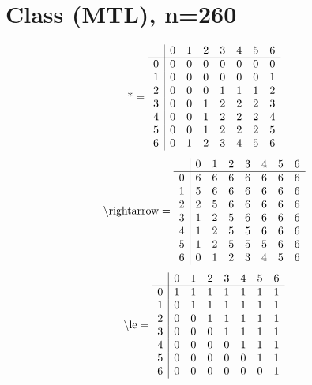 \documentclass[11pt]{article}
\begin{document}
\section{Class (MTL), n=260}
\[\text{*} = 
\begin{array}{r | r r r r r r r}
 & 0 & 1 & 2 & 3 & 4 & 5 & 6 \\ \hline
0 & 0 & 0 & 0 & 0 & 0 & 0 & 0 \\
1 & 0 & 0 & 0 & 0 & 0 & 0 & 1 \\
2 & 0 & 0 & 0 & 1 & 1 & 1 & 2 \\
3 & 0 & 0 & 1 & 2 & 2 & 2 & 3 \\
4 & 0 & 0 & 1 & 2 & 2 & 2 & 4 \\
5 & 0 & 0 & 1 & 2 & 2 & 2 & 5 \\
6 & 0 & 1 & 2 & 3 & 4 & 5 & 6 \\
\end{array}
\]
\[\text{\textbackslash rightarrow} = 
\begin{array}{r | r r r r r r r}
 & 0 & 1 & 2 & 3 & 4 & 5 & 6 \\ \hline
0 & 6 & 6 & 6 & 6 & 6 & 6 & 6 \\
1 & 5 & 6 & 6 & 6 & 6 & 6 & 6 \\
2 & 2 & 5 & 6 & 6 & 6 & 6 & 6 \\
3 & 1 & 2 & 5 & 6 & 6 & 6 & 6 \\
4 & 1 & 2 & 5 & 5 & 6 & 6 & 6 \\
5 & 1 & 2 & 5 & 5 & 5 & 6 & 6 \\
6 & 0 & 1 & 2 & 3 & 4 & 5 & 6 \\
\end{array}
\]
\[\text{\textbackslash le} = 
\begin{array}{r | r r r r r r r}
 & 0 & 1 & 2 & 3 & 4 & 5 & 6 \\ \hline
0 & 1 & 1 & 1 & 1 & 1 & 1 & 1 \\
1 & 0 & 1 & 1 & 1 & 1 & 1 & 1 \\
2 & 0 & 0 & 1 & 1 & 1 & 1 & 1 \\
3 & 0 & 0 & 0 & 1 & 1 & 1 & 1 \\
4 & 0 & 0 & 0 & 0 & 1 & 1 & 1 \\
5 & 0 & 0 & 0 & 0 & 0 & 1 & 1 \\
6 & 0 & 0 & 0 & 0 & 0 & 0 & 1 \\
\end{array}
\]
\end{document}
